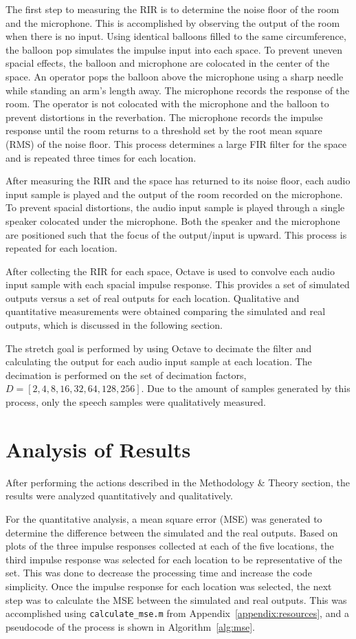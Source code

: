 \documentclass[letterpaper, 11pt, onecolumn, oneside]{article}
\begin{document}
The first step to measuring the RIR is to determine the noise floor of the room and the microphone.
This is accomplished by observing the output of the room when there is no input.
Using identical balloons filled to the same circumference, the balloon pop simulates the impulse input into each space.
To prevent uneven spacial effects, the balloon and microphone are colocated in the center of the space.
An operator pops the balloon above the microphone using a sharp needle while standing an arm's length away.
The microphone records the response of the room.
The operator is not colocated with the microphone and the balloon to prevent distortions in the reverbation.
The microphone records the impulse response until the room returns to a threshold set by the root mean square (RMS) of the noise floor.
This process determines a large FIR filter for the space and is repeated three times for each location.

After measuring the RIR and the space has returned to its noise floor, each audio input sample is played and the output of the room recorded on the microphone.
To prevent spacial distortions, the audio input sample is played through a single speaker colocated under the microphone.
Both the speaker and the microphone are positioned such that the focus of the output/input is upward.
This process is repeated for each location.

After collecting the RIR for each space, Octave is used to convolve each audio input sample with each spacial impulse response.
This provides a set of simulated outputs versus a set of real outputs for each location.
Qualitative and quantitative measurements were obtained comparing the simulated and real outputs, which is discussed in the following section.

The stretch goal is performed by using Octave to decimate the filter and calculating the output for each audio input sample at each location.
The decimation is performed on the set of decimation factors, $D = [2, 4, 8, 16, 32, 64, 128, 256]$.
Due to the amount of samples generated by this process, only the speech samples were qualitatively measured.

\clearpage
\section{Analysis of Results}
After performing the actions described in the Methodology \& Theory section, the results were analyzed quantitatively and qualitatively.

For the quantitative analysis, a mean square error (MSE) was generated to determine the difference between the simulated and the real outputs.
Based on plots of the three impulse responses collected at each of the five locations, the third impulse response was selected for each location to be representative of the set.
This was done to decrease the processing time and increase the code simplicity.
Once the impulse response for each location was selected, the next step was to calculate the MSE between the simulated and real outputs.
This was accomplished using \texttt{calculate\_mse.m} from Appendix~\ref{appendix:resources}, and a pseudocode of the process is shown in Algorithm~\ref{alg:mse}.
\end{document}

